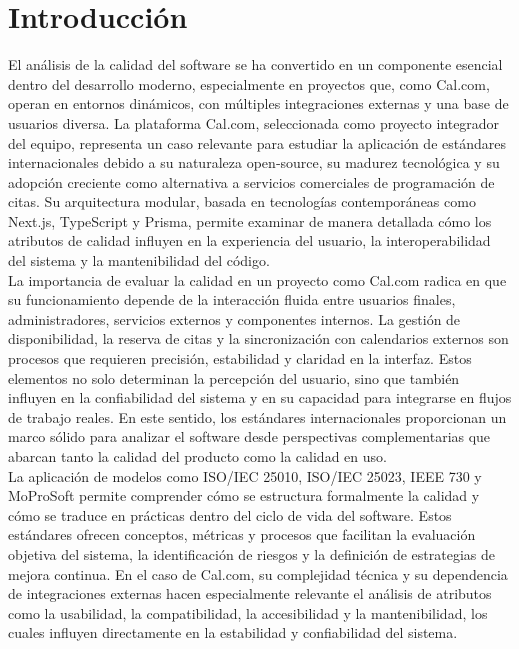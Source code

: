 \documentclass{article}
\begin{document}
\newpage
\section{Introducción}
El análisis de la calidad del software se ha convertido en un componente esencial dentro del desarrollo moderno, especialmente en proyectos que, como Cal.com, operan en entornos dinámicos, con múltiples integraciones externas y una base de usuarios diversa. La plataforma Cal.com, seleccionada como proyecto integrador del equipo, representa un caso relevante para estudiar la aplicación de estándares internacionales debido a su naturaleza open‑source, su madurez tecnológica y su adopción creciente como alternativa a servicios comerciales de programación de citas. Su arquitectura modular, basada en tecnologías contemporáneas como Next.js, TypeScript y Prisma, permite examinar de manera detallada cómo los atributos de calidad influyen en la experiencia del usuario, la interoperabilidad del sistema y la mantenibilidad del código.\\

La importancia de evaluar la calidad en un proyecto como Cal.com radica en que su funcionamiento depende de la interacción fluida entre usuarios finales, administradores, servicios externos y componentes internos. La gestión de disponibilidad, la reserva de citas y la sincronización con calendarios externos son procesos que requieren precisión, estabilidad y claridad en la interfaz. Estos elementos no solo determinan la percepción del usuario, sino que también influyen en la confiabilidad del sistema y en su capacidad para integrarse en flujos de trabajo reales. En este sentido, los estándares internacionales proporcionan un marco sólido para analizar el software desde perspectivas complementarias que abarcan tanto la calidad del producto como la calidad en uso.\\

La aplicación de modelos como ISO/IEC 25010, ISO/IEC 25023, IEEE 730 y MoProSoft permite comprender cómo se estructura formalmente la calidad y cómo se traduce en prácticas dentro del ciclo de vida del software. Estos estándares ofrecen conceptos, métricas y procesos que facilitan la evaluación objetiva del sistema, la identificación de riesgos y la definición de estrategias de mejora continua. En el caso de Cal.com, su complejidad técnica y su dependencia de integraciones externas hacen especialmente relevante el análisis de atributos como la usabilidad, la compatibilidad, la accesibilidad y la mantenibilidad, los cuales influyen directamente en la estabilidad y confiabilidad del sistema.\\
\end{document}
